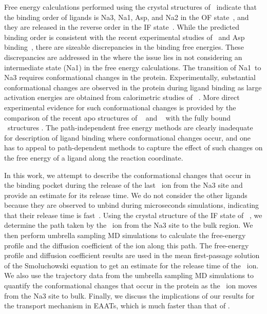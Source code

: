 Free energy calculations performed using the crystal structures of \GltPh\ indicate that the 
binding order of ligands is Na3, Na1, Asp, and Na2 in the OF state~\cite{Heinzelmann2011}, and 
they are released in the reverse order in the IF state~\cite{Heinzelmann2013}. While the predicted 
binding order is consistent with the recent experimental studies of \Na\ and Asp 
binding~\cite{Reyes2013b,Ewers2013,Hanelt2015}, there are sizeable discrepancies in the binding 
free energies. These discrepancies are addressed in the  where the issue lies 
in not considering an intermediate state (Na1\prim) in the free energy calculations. The transition 
of Na1\prim\ to Na3 requires conformational changes in the protein. Experimentally, substantial 
conformational changes are observed in the protein during ligand binding as large activation 
energies are obtained from calorimetric studies of \GltPh\ 
\cite{Reyes2013b,Ewers2013,Hanelt2015}. More direct experimental evidence for such conformational 
changes is provided by the comparison of the recent apo structures of \GltPh\ 
\cite{Verdon2014} and \GltTk~\cite{Jensen2013} with the fully bound \GltPh\ structures 
\cite{Boudker2007,Reyes2009}. The path-independent free energy methods are 
clearly inadequate for description of ligand binding where conformational changes occur, and one 
has to appeal to path-dependent methods to capture the effect of such changes on the free energy 
of a ligand along the reaction coordinate.

In this work, we attempt to describe the conformational changes that occur in the binding pocket 
during the release of the last \Na\ ion from the Na3 site and provide an estimate for its release 
time. We do not consider the other ligands because they are observed to unbind during microseconds 
simulations, indicating that their release time is fast~\cite{Zomot2013}. Using the crystal structure 
of the IF state of \GltPh~\cite{Reyes2009}, we determine the path taken by the \Na\ ion from the Na3 
site to the bulk region. We then perform umbrella sampling MD simulations to calculate the free-energy 
profile and the diffusion coefficient of the ion along this path. The free-energy profile and diffusion 
coefficient results are used in the mean first-passage solution of the Smoluchowski equation to get 
an estimate for the release time of the \Na\ ion. We also use the trajectory data from the umbrella 
sampling MD simulations to quantify the conformational changes that occur in the protein as the \Na\ 
ion moves from the Na3 site to bulk. Finally, we discuss the implications of our results for the 
transport mechanism in EAATs, which is much faster than that of \GltPh.

